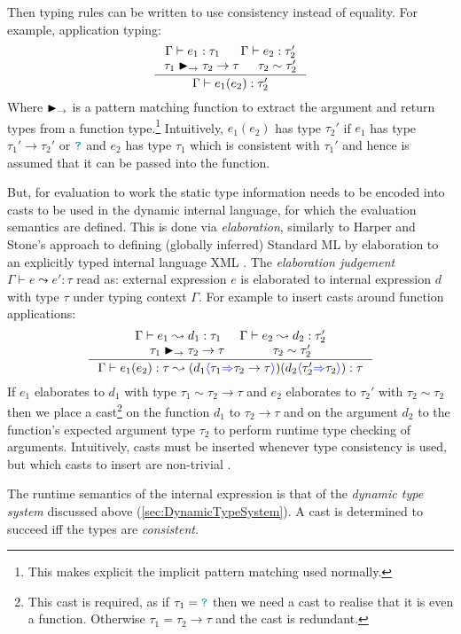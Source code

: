 Then typing rules can be written to use consistency instead of equality. For example, application typing:
\[\inference{\Gamma \vdash e_1 : \tau_1 & \Gamma \vdash e_2 : \tau_2'\\ \tau_1 \funmatch \tau_2 \to \tau & \tau_2 \sim \tau_2'}{\Gamma \vdash e_1(e_2) : \tau_2'}\]
Where $\blacktriangleright_\rightarrow$ is a pattern matching function to extract the argument and return types from a function type.\footnote{This makes explicit the implicit pattern matching used normally.}
Intuitively, $e_1(e_2)$ has type $\tau_2'$ if $e_1$ has type $\tau_1' \to \tau_2'$ or ${\color{teal}\texttt{?}}$ and $e_2$ has type $\tau_1$ which is consistent with $\tau_1'$ and hence is assumed that it can be passed into the function.

But, for evaluation to work the static type information needs to be encoded into casts to be used in the dynamic internal language, for which the evaluation semantics are defined. This is done via \textit{elaboration}, similarly to Harper and Stone's approach to defining (globally inferred) Standard ML \cite{StandardMLTypeTheory} by elaboration to an explicitly typed internal language XML \cite{CoreXML}. The \textit{elaboration judgement} $\Gamma \vdash e \leadsto e' : \tau$ read as: external expression $e$ is elaborated to internal expression $d$ with type $\tau$ under typing context $\Gamma$. For example to insert casts around function applications:
\[\inference{\Gamma \vdash e_1 \leadsto d_1 : \tau_1 & \Gamma \vdash e_2 \leadsto d_2 : \tau_2' \\ \tau_1 \funmatch \tau_2 \to \tau  & \tau_2 \sim \tau_2'}{\Gamma \vdash e_1(e_2) : \tau \leadsto (d_1\scast{\tau_1}{\tau_2 \to \tau})(d_2\scast{\tau_2'}{\tau_2}) : \tau}\]
If $e_1$ elaborates to $d_1$ with type $\tau_1 \sim \tau_2 \to \tau$ and $e_2$ elaborates to $\tau_2'$ with $\tau_2 \sim \tau_2$ then we place a cast\footnote{This cast is required, as if $\tau_1 = {\color{teal}\texttt{?}}$ then we need a cast to realise that it is even a function. Otherwise $\tau_1 = \tau_2 \to \tau$ and the cast is redundant.} on the function $d_1$ to $\tau_2 \to \tau$ and on the argument $d_2$ to the function's expected argument type $\tau_2$ to perform runtime type checking of arguments.
Intuitively, casts must be inserted whenever type consistency is used, but which casts to insert are non-trivial \cite{Gradualizer}.

The runtime semantics of the internal expression is that of the \textit{dynamic type system} discussed above (\ref{sec:DynamicTypeSystem}). A cast is determined to succeed iff the types are \textit{consistent}.

